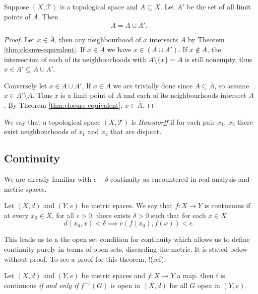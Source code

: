 
\begin{thm}
  \label{thm:limit-closure}
  Suppose $(X,\mathscr{T})$ is a topological space and $A \subseteq
  X$. Let $A'$ be the set of all limit points of $A$. Then
  \[
    \overline{A} = A \cup A'.
  \]
\end{thm}

\begin{proof}
  Let $x \in \overline{A}$, then any neighbourhood of $x$ intersects
  $A$ by Theorem \ref{thm:closure-equivalent}. If $x \in A$ we have $x
  \in (A \cup A')$. If $x \not\in A$, the intersection of each of its
  neighbourhoods with $A \setminus \{ x \} = A$ is still nonempty,
  thus $x \in A' \subseteq A \cup A'$. 

  Conversely let $x \in A \cup A'$, If $x \in A$ we are trivially done
  since $A \subseteq \overline{A}$, so assume $x \in A' \setminus
  A$. Thus $x$ is a limit point of $A$ and each of its neighbourhoods
  intersect $A$. By Theorem \ref{thm:closure-equivalent}, $x \in
  \overline{A}$.
\end{proof}

\begin{defn}
  We say that a topological space $(X, \mathscr{T})$ is
  \emph{Hausdorff} if for each pair $x_1$, $x_2$ there exist
  neighbourhoods of $x_1$ and $x_2$ that are disjoint.
\end{defn}

\subsection{Continuity}
\label{sec:prelims:continuity}

We are already familiar with $\epsilon-\delta$ continuity as
encountered in real analysis and metric spaces.

\begin{defn}
  Let $(X,d)$ and $(Y,e)$ be metric spaces. We say that $f: X
  \rightarrow Y$ is continuous if at every $x_0 \in X$, for all
  $\epsilon > 0$, there exists $\delta > 0$ such that for each $x \in
  X$
  \[
    d(x_0,x) < \delta \implies e(f(x_0),f(x)) < \epsilon.
  \]
\end{defn}

This leads us to a the open set condition for continuity which allows
us to define continuity purely in terms of open sets, discarding the
metric. It is stated below without proof. To see a proof for this
theorem, !(ref).

\begin{thm}
  Let $(X,d)$ and $(Y,e)$ be metric spaces and $f:X \rightarrow Y$
  a map. then f is continuous \emph{if and only if} $f^{-1}(G)$ is open
  in $(X,d)$ for all $G$ open in $(Y,e)$.
\end{thm}

